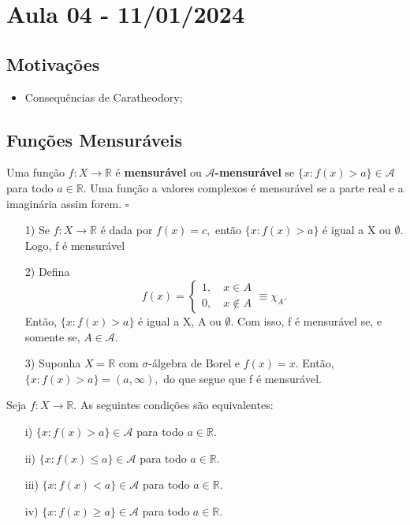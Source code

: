 \documentclass[MeasureTheory/measure_theory.tex]{subfiles}
\begin{document}
\section{Aula 04 - 11/01/2024}
\subsection{Motivações}
\begin{itemize}
	\item Consequências de Caratheodory;
\end{itemize}
\subsection{Funções Mensuráveis}
\begin{def*}
	Uma função \(f:X\rightarrow \mathbb{R}\) é \textbf{mensurável} ou \(\mathcal{A}\)\textbf{-mensurável} se \(\{x: f(x) > a\}\in \mathcal{A}\) para todo \(a\in \mathbb{R}.\) Uma função
	a valores complexos é mensurável se a parte real e a imaginária assim forem. \(\square\)
\end{def*}
\begin{example}
	\begin{itemize}
		\item[1)] Se \(f:X\rightarrow \mathbb{R}\) é dada por \(f(x) = c,\) então \(\{x: f(x) > a\}\) é igual a X ou \(\emptyset .\) Logo, f é mensurável
		\item[2)] Defina
		      \[
			      f(x)  = \left\{\begin{array}{ll}
				      1,\quad x\in A \\
				      0,\quad x\not\in A
			      \end{array}\right.\equiv \chi_{A}.
		      \]
		      Então, \(\{x: f(x) > a\}\) é igual a X, A ou \(\emptyset .\) Com isso, f é mensurável se, e somente se, \(A\in \mathcal{A}.\)
		\item[3)] Suponha \(X = \mathbb{R}\) com \(\sigma \)-álgebra de Borel e \(f(x) = x\). Então, \(\{x: f(x) > a\} = (a, \infty),\) do que
		      segue que f é mensurável.
	\end{itemize}
\end{example}
\begin{prop*}
	Seja \(f:X\rightarrow \mathbb{R}.\) As seguintes condições são equivalentes:
	\begin{itemize}
		\item[i)] \(\{x: f(x) > a\}\in \mathcal{A}\) para todo \(a\in \mathbb{R}.\)
		\item[ii)] \(\{x: f(x) \leq  a\}\in \mathcal{A}\) para todo \(a\in \mathbb{R}.\)
		\item[iii)] \(\{x: f(x) < a\}\in \mathcal{A}\) para todo \(a\in \mathbb{R}.\)
		\item[iv)] \(\{x: f(x) \geq  a\}\in \mathcal{A}\) para todo \(a\in \mathbb{R}.\)
	\end{itemize}
\end{prop*}
\end{document}
